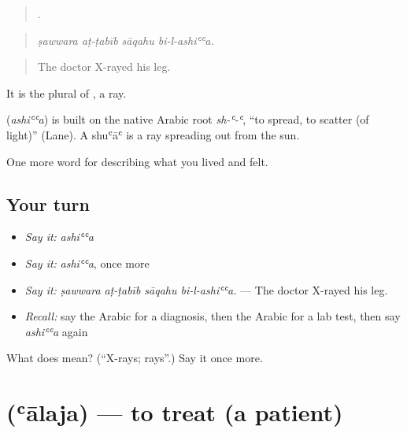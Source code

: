 \begin{quote}
   .
\end{quote}

\begin{quote}
\emph{ṣawwara aṭ-ṭabīb sāqahu bi-l-ashiʿʿa.}
\end{quote}

\begin{quote}
The doctor X-rayed his leg.
\end{quote}

It is the plural of , a ray.

\begin{cousinweb}
\textbf{} (\emph{ashiʿʿa}) is built on the native Arabic root \emph{sh-ʿ-ʿ}, \textquotedblleft{}to spread, to scatter (of light)\textquotedblright{} (Lane). A shuʿāʿ is a ray spreading out from the sun.
\end{cousinweb}

\begin{grammarlens}[title={What you've built}]
One more word for describing what you lived and felt.
\end{grammarlens}

\subsection*{Your turn}
\begin{itemize}
\raggedright
  \item \emph{Say it:} \emph{ashiʿʿa}
  \item \emph{Say it:} \emph{ashiʿʿa}, once more
  \item \emph{Say it:} \emph{ṣawwara aṭ-ṭabīb sāqahu bi-l-ashiʿʿa.} — The doctor X-rayed his leg.
  \item \emph{Recall:} say the Arabic for a diagnosis, then the Arabic for a lab test, then say \emph{ashiʿʿa} again
\end{itemize}

\begin{tcolorbox}[breakable,colback=teal!4,colframe=teal!35!black,title={Before you move on}]
What does  mean? (\textquotedblleft{}X-rays; rays\textquotedblright{}.) Say it once more.
\end{tcolorbox}
\section[\texorpdfstring{\ar{عالج} (ʿālaja)}{عالج (ʿālaja)}]{ (ʿālaja) — to treat (a patient)}

